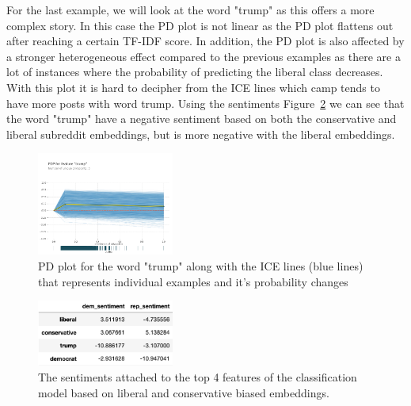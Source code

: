 \documentclass[conference]{IEEEtran}
\begin{document}
For the last example, we will look at the word "trump" as this offers a more complex story. In this case the PD plot is not linear as the PD plot flattens out after reaching a certain TF-IDF score. In addition, the PD plot is also affected by a stronger heterogeneous effect compared to the previous examples as there are a lot of instances where the probability of predicting the liberal class decreases. With this plot it is hard to decipher from the ICE lines which camp tends to have more posts with word trump. Using the sentiments Figure~\ref{fig:sentiments} we can see that the word "trump" have a negative sentiment based on both the conservative and liberal subreddit embeddings, but is more negative with the liberal embeddings.

\begin{figure}[tb]
    \centering
    \includegraphics[width=0.4\textwidth]{trump_pdp.pdf}
    \vspace{-2mm}
    \caption{PD plot for the word "trump" along with the ICE lines (blue lines) that represents individual examples and it's probability changes}
    \label{fig:trump_pdp}
    \vspace{-5mm}
\end{figure}

\begin{figure}[tb]
    \centering
    \includegraphics[width=0.4\textwidth]{sentiments.pdf}
    \vspace{-2mm}
    \caption{The sentiments attached to the top 4 features of the classification model based on liberal and conservative biased embeddings.}
    \label{fig:sentiments}
    \vspace{-5mm}
\end{figure}
\end{document}
